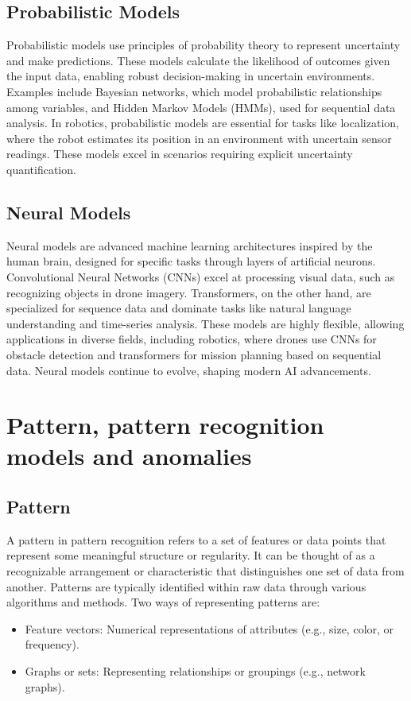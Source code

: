 \subsection{Probabilistic Models}
Probabilistic models use principles of probability theory to represent uncertainty and make predictions. These models calculate the likelihood of outcomes given the input data, enabling robust decision-making in uncertain environments. Examples include Bayesian networks, which model probabilistic relationships among variables, and Hidden Markov Models (HMMs), used for sequential data analysis. In robotics, probabilistic models are essential for tasks like localization, where the robot estimates its position in an environment with uncertain sensor readings. These models excel in scenarios requiring explicit uncertainty quantification. 

\subsection{Neural Models}
Neural models are advanced machine learning architectures inspired by the human brain, designed for specific tasks through layers of artificial neurons. Convolutional Neural Networks (CNNs) excel at processing visual data, such as recognizing objects in drone imagery. Transformers, on the other hand, are specialized for sequence data and dominate tasks like natural language understanding and time-series analysis. These models are highly flexible, allowing applications in diverse fields, including robotics, where drones use CNNs for obstacle detection and transformers for mission planning based on sequential data. Neural models continue to evolve, shaping modern AI advancements. 






\section{Pattern, pattern recognition models and anomalies}
    \subsection{Pattern} A pattern in pattern recognition refers to a set of features or data points that represent some meaningful structure or regularity. It can be thought of as a recognizable arrangement or characteristic that distinguishes one set of data from another. Patterns are typically identified within raw data through various algorithms and methods. Two ways of representing patterns are:
    \begin{itemize}
        \item Feature vectors: Numerical representations of attributes (e.g., size, color, or frequency).
        \item Graphs or sets: Representing relationships or groupings (e.g., network graphs).
    \end{itemize}
